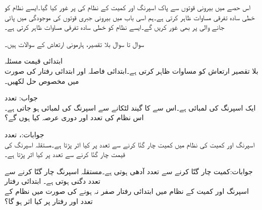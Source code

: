 
اس حصے میں بیرونی قوتوں سے پاک  اسپرنگ اور کمیت کے نظام کی  پر غور کیا گیا۔ایسے نظام کو  خطی سادہ تفرقی مساوات ظاہر کرتی ہے۔ہم اسی باب میں بیرونی جبری قوتوں کی موجودگی میں پائی جانے والی  پر بھی غور کریں گے۔ایسے نظام کو  خطی سادہ تفرقی مساوات ظاہر کرتی ہے۔


سوال  تا سوال  بلا تقصیر، ہارمونی ارتعاش کے سوالات ہیں۔

 \quad ابتدائی قیمت مسئلہ\\
بلا تقصیر ارتعاش کو مساوات  ظاہر کرتی ہے۔ابتدائی فاصلہ  اور ابتدائی رفتار  کی صورت میں مخصوص حل لکھیں۔

جواب: 
\quad تعدد\\
ایک اسپرنگ کی لمبائی  ہے۔اس سے  کا گیند لٹکانے سے اسپرنگ کی لمبائی  ہو جاتی ہے۔اس نظام کی تعدد  اور دوری عرصہ  کیا ہوں گے؟ 

جوابات:، 
\quad تعدد\\
اسپرنگ اور کمیت کی نظام میں کمیت چار گنّا کرنے سے تعدد پر کیا اثر پڑتا ہے۔مستقلہ اسپرنگ کی قیمت چار گنّا کرنے سے تعدد پر کیا اثر پڑتا ہے۔

 جوابات:کمیت چار گنّا کرنے سے تعدد آدھی ہوتی ہے۔مستقلہ اسپرنگ چار گنّا کرنے سے تعدد دگنی ہوتی ہے۔ 
\quad ابتدائی رفتار\\
اسپرنگ اور کمیت کے نظام میں ابتدائی رفتار صفر نہ ہونے کی صورت میں نظام کے تعدد اور رفتار پر کیا اثر ہو گا؟

